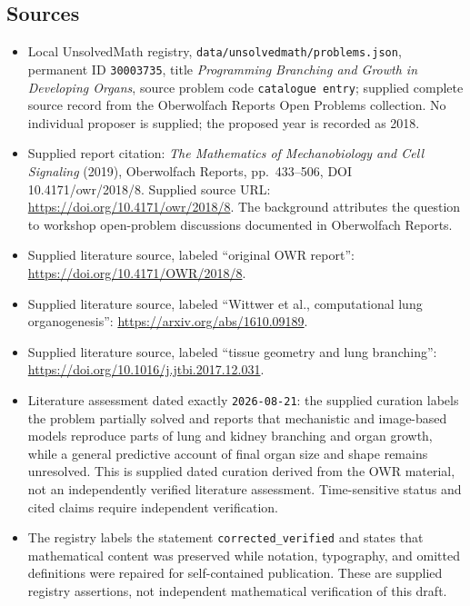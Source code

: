 \documentclass[11pt]{article}
\begin{document}
\subsection{Sources}
\begin{itemize}
\item Local UnsolvedMath registry, \texttt{data/unsolvedmath/problems.json}, permanent ID \texttt{30003735}, title \emph{Programming Branching and Growth in Developing Organs}, source problem code \texttt{catalogue entry}; supplied complete source record from the Oberwolfach Reports Open Problems collection. No individual proposer is supplied; the proposed year is recorded as 2018.
\item Supplied report citation: \emph{The Mathematics of Mechanobiology and Cell Signaling} (2019), Oberwolfach Reports, pp.\ 433--506, DOI 10.4171/owr/2018/8. Supplied source URL: \url{https://doi.org/10.4171/owr/2018/8}. The background attributes the question to workshop open-problem discussions documented in Oberwolfach Reports.
\item Supplied literature source, labeled ``original OWR report'': \url{https://doi.org/10.4171/OWR/2018/8}.
\item Supplied literature source, labeled ``Wittwer et al., computational lung organogenesis'': \url{https://arxiv.org/abs/1610.09189}.
\item Supplied literature source, labeled ``tissue geometry and lung branching'': \url{https://doi.org/10.1016/j.jtbi.2017.12.031}.
\item Literature assessment dated exactly \texttt{2026-08-21}: the supplied curation labels the problem partially solved and reports that mechanistic and image-based models reproduce parts of lung and kidney branching and organ growth, while a general predictive account of final organ size and shape remains unresolved. This is supplied dated curation derived from the OWR material, not an independently verified literature assessment. Time-sensitive status and cited claims require independent verification.
\item The registry labels the statement \texttt{corrected\_verified} and states that mathematical content was preserved while notation, typography, and omitted definitions were repaired for self-contained publication. These are supplied registry assertions, not independent mathematical verification of this draft.
\end{itemize}
\end{document}
